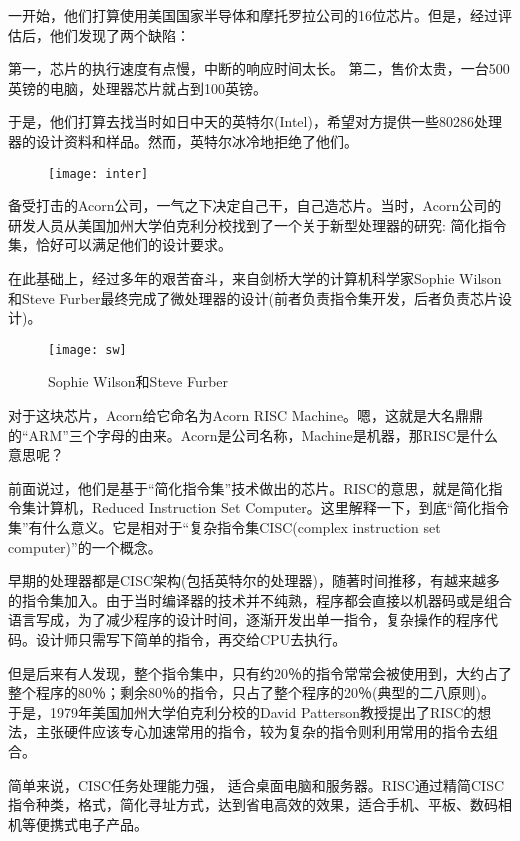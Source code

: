 \documentclass[utf8]{book}
\begin{document}
	一开始，他们打算使用美国国家半导体和摩托罗拉公司的16位芯片。但是，经过评估后，他们发现了两个缺陷：

	第一，芯片的执行速度有点慢，中断的响应时间太长。
	第二，售价太贵，一台500英镑的电脑，处理器芯片就占到100英镑。

	于是，他们打算去找当时如日中天的英特尔(Intel)，希望对方提供一些80286处理器的设计资料和样品。然而，英特尔冰冷地拒绝了他们。

	\begin{figure}[H]
		\centering
		\texttt{[image: inter]}
	\end{figure}
	备受打击的Acorn公司，一气之下决定自己干，自己造芯片。当时，Acorn公司的研发人员从美国加州大学伯克利分校找到了一个关于新型处理器的研究: 简化指令集，恰好可以满足他们的设计要求。

	在此基础上，经过多年的艰苦奋斗，来自剑桥大学的计算机科学家Sophie Wilson和Steve Furber最终完成了微处理器的设计(前者负责指令集开发，后者负责芯片设计)。
	
	\begin{figure}[H]
		\centering
		\texttt{[image: sw]}
		\caption{Sophie Wilson和Steve Furber}
	\end{figure}
	对于这块芯片，Acorn给它命名为Acorn RISC Machine。嗯，这就是大名鼎鼎的“ARM”三个字母的由来。Acorn是公司名称，Machine是机器，那RISC是什么意思呢？

	前面说过，他们是基于“简化指令集”技术做出的芯片。RISC的意思，就是简化指令集计算机，Reduced Instruction Set Computer。这里解释一下，到底“简化指令集”有什么意义。它是相对于“复杂指令集CISC(complex instruction set computer)”的一个概念。

	早期的处理器都是CISC架构(包括英特尔的处理器)，随著时间推移，有越来越多的指令集加入。由于当时编译器的技术并不纯熟，程序都会直接以机器码或是组合语言写成，为了减少程序的设计时间，逐渐开发出单一指令，复杂操作的程序代码。设计师只需写下简单的指令，再交给CPU去执行。

	但是后来有人发现，整个指令集中，只有约20％的指令常常会被使用到，大约占了整个程序的80％；剩余80％的指令，只占了整个程序的20％(典型的二八原则)。
	于是，1979年美国加州大学伯克利分校的David Patterson教授提出了RISC的想法，主张硬件应该专心加速常用的指令，较为复杂的指令则利用常用的指令去组合。

	简单来说，CISC任务处理能力强， 适合桌面电脑和服务器。RISC通过精简CISC指令种类，格式，简化寻址方式，达到省电高效的效果，适合手机、平板、数码相机等便携式电子产品。
\end{document}
